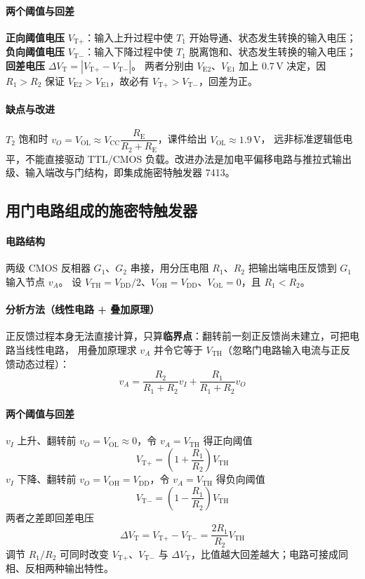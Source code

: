 \paragraph{两个阈值与回差}
\textbf{正向阈值电压} $V_{\text{T}+}$：输入上升过程中使 $T_1$ 开始导通、状态发生转换的输入电压；
\textbf{负向阈值电压} $V_{\text{T}-}$：输入下降过程中使 $T_1$ 脱离饱和、状态发生转换的输入电压；
\textbf{回差电压} $\Delta V_\text{T}=\left|V_{\text{T}+}-V_{\text{T}-}\right|$。
两者分别由 $V_{\text{E}2}$、$V_{\text{E}1}$ 加上 $0.7\,\mathrm{V}$ 决定，因 $R_1>R_2$ 保证 $V_{\text{E}2}>V_{\text{E}1}$，故必有 $V_{\text{T}+}>V_{\text{T}-}$，回差为正。

\paragraph{缺点与改进}
$T_2$ 饱和时 $v_O=V_\text{OL}\approx V_\text{CC}\dfrac{R_\text{E}}{R_2+R_\text{E}}$，课件给出 $V_\text{OL}\approx1.9\,\mathrm{V}$，
远非标准逻辑低电平，不能直接驱动 TTL/CMOS 负载。改进办法是加电平偏移电路与推拉式输出级、输入端改与门结构，即集成施密特触发器 7413。

\subsection{用门电路组成的施密特触发器}
\paragraph{电路结构}
两级 CMOS 反相器 $G_1$、$G_2$ 串接，用分压电阻 $R_1$、$R_2$ 把输出端电压反馈到 $G_1$ 输入节点 $v_A$。
设 $V_\text{TH}=V_\text{DD}/2$、$V_\text{OH}=V_\text{DD}$、$V_\text{OL}=0$，且 $R_1<R_2$。

\paragraph{分析方法（线性电路 + 叠加原理）}
正反馈过程本身无法直接计算，只算\textbf{临界点}：翻转前一刻正反馈尚未建立，可把电路当线性电路，
用叠加原理求 $v_A$ 并令它等于 $V_\text{TH}$（忽略门电路输入电流与正反馈动态过程）：
\[
v_A=\frac{R_2}{R_1+R_2}v_I+\frac{R_1}{R_1+R_2}v_O
\]

\paragraph{两个阈值与回差}
$v_I$ 上升、翻转前 $v_O=V_\text{OL}\approx0$，令 $v_A=V_\text{TH}$ 得正向阈值
\[
V_{\text{T}+}=\left(1+\frac{R_1}{R_2}\right)V_\text{TH}
\]
$v_I$ 下降、翻转前 $v_O=V_\text{OH}=V_\text{DD}$，令 $v_A=V_\text{TH}$ 得负向阈值
\[
V_{\text{T}-}=\left(1-\frac{R_1}{R_2}\right)V_\text{TH}
\]
两者之差即回差电压
\[
\Delta V_\text{T}=V_{\text{T}+}-V_{\text{T}-}=\frac{2R_1}{R_2}V_\text{TH}
\]
调节 $R_1/R_2$ 可同时改变 $V_{\text{T}+}$、$V_{\text{T}-}$ 与 $\Delta V_\text{T}$，比值越大回差越大；电路可接成同相、反相两种输出特性。

